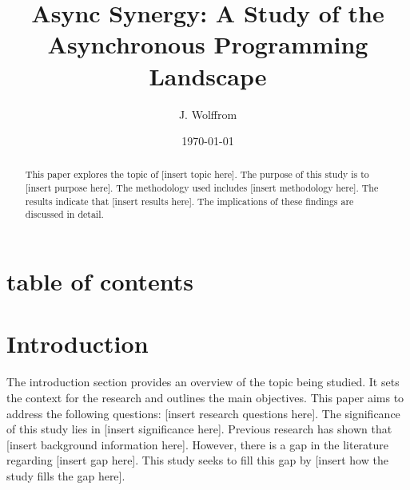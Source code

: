 \documentclass{article}
\title{Async Synergy: A Study of the Asynchronous Programming Landscape}
\author{J. Wolffrom}
\date{\today}
\begin{document}
\maketitle

\begin{abstract}
This paper explores the topic of [insert topic here]. The purpose of this study is to [insert purpose here]. The methodology used includes [insert methodology here]. The results indicate that [insert results here]. The implications of these findings are discussed in detail.
\end{abstract}

\section{table of contents}

\tableofcontents

\section{Introduction}

The introduction section provides an overview of the topic being studied. It sets the context for the research and outlines the main objectives. This paper aims to address the following questions: [insert research questions here]. The significance of this study lies in [insert significance here]. Previous research has shown that [insert background information here]. However, there is a gap in the literature regarding [insert gap here]. This study seeks to fill this gap by [insert how the study fills the gap here].
\end{document}
